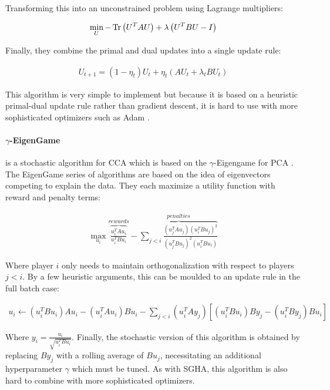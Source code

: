 Transforming this into an unconstrained problem using Lagrange multipliers:

\begin{align}
    \min_{U} -\operatorname{Tr}\left(U^T A U \right) + \lambda \left(U^T B U - I\right)
\end{align}

Finally, they combine the primal and dual updates into a single update rule:

\begin{align}
    U_{t+1} = \left(1 - \eta_t\right) U_t + \eta_t \left(A U_t + \lambda_t B U_t\right)
\end{align}

This algorithm is very simple to implement but because it is based on a heuristic primal-dual update rule rather than gradient descent, it is hard to use with more sophisticated optimizers such as Adam \citep{kingma2014adam}.

\paragraph{$\gamma$-EigenGame} is a stochastic algorithm for CCA which is based on the $\gamma$-Eigengame for PCA \citep{gemp20}.
The EigenGame series of algorithms are based on the idea of eigenvectors competing to explain the data.
They each maximize a utility function with reward and penalty terms:

\begin{align}
    \max_{u_i} \overbrace{\frac{u_i^TAu_i}{u_i^TBu_i}}^{rewards} - \overbrace{\sum_{j < i} \frac{(u_j^TAu_j)(u_i^TBu_j)^2}{(u_j^TBu_j)^2(u_i^TBu_i)}}^{penalties}
\end{align}

Where player $i$ only needs to maintain orthogonalization with respect to players $j < i$.
By a few heuristic arguments, this can be moulded to an update rule in the full batch case:

\begin{align}
    u_i \leftarrow (u_i^T B u_i)A u_i - (u_i^T A u_i)B u_i - \sum_{j < i} (u_i^T A y_j)[(u_i^T B u_i)B y_j - (u_i^T B y_j)B u_i]
\end{align}

Where $y_i = \frac{u_i}{\sqrt{u_i^TBu_i}}$.
Finally, the stochastic version of this algorithm is obtained by replacing $B y_j$ with a rolling average of $B u_j$, necessitating an additional hyperparameter $\gamma$ which must be tuned.
As with SGHA, this algorithm is also hard to combine with more sophisticated optimizers.

